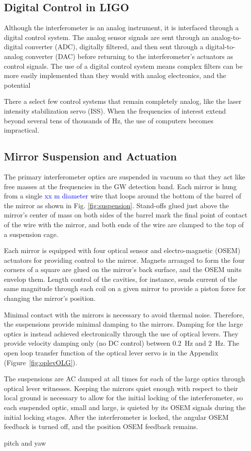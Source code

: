 \subsection{Digital Control in LIGO}
Although the interferometer is an analog instrument, it is interfaced
through a digital control system. The analog sensor signals are sent
through an analog-to-digital converter (ADC), digitally filtered, and
then sent through a digital-to-analog converter (DAC) before returning
to the interferometer's actuators as control signals. The use of a digital
control system means complex filters can be more easily implemented
than they would with analog electronics, and the potential 

There a select few control systems that remain completely analog, like
the laser intensity stabilization servo (ISS). When the frequencies of
interest extend beyond several tens of thousands of Hz, the use of
computers becomes impractical.




\subsection{Mirror Suspension and Actuation}
\label{sec:suspension}
The primary interferometer optics are suspended in vacuum so that they
act like free masses at the frequencies in the GW detection band. Each
mirror is hung from a single \textcolor{blue}{xx m diameter} wire that
loops around the bottom of the barrel of the mirror as shown in
Fig. \ref{fig:suspension}. Stand-offs glued just above the mirror's
center of mass on both sides of the barrel mark the final point of
contact of the wire with the mirror, and both ends of the wire are
clamped to the top of a suspension cage.

Each mirror is equipped with four optical sensor and electro-magnetic
(OSEM) actuators for providing control to the mirror. Magnets arranged
to form the four corners of a square are glued on the mirror's back
surface, and the OSEM units envelop them. Length control of the
cavities, for instance, sends current of the same magnitude through
each coil on a given mirror to provide a piston force for changing the
mirror's position.

Minimal contact with the mirrors is necessary to avoid thermal
noise. Therefore, the suspensions provide minimal damping to the
mirrors. Damping for the large optics is instead achieved
electronically through the use of optical levers. They provide
velocity damping only (no DC control) between 0.2~Hz and 2~Hz. The
open loop transfer function of the optical lever servo is in the
Appendix (Figure~\ref{fig:oplevOLG}).

The suspensions are AC damped at all times for each of the large
optics through optical lever witnesses. Keeping the mirrors quiet
enough with respect to their local ground is necessary to allow for
the initial locking of the interferometer, so each suspended optic,
small and large, is quieted by its OSEM signals during the initial
locking stages. After the interferometer is locked, the angular OSEM
feedback is turned off, and the position OSEM feedback remains.

pitch and yaw

